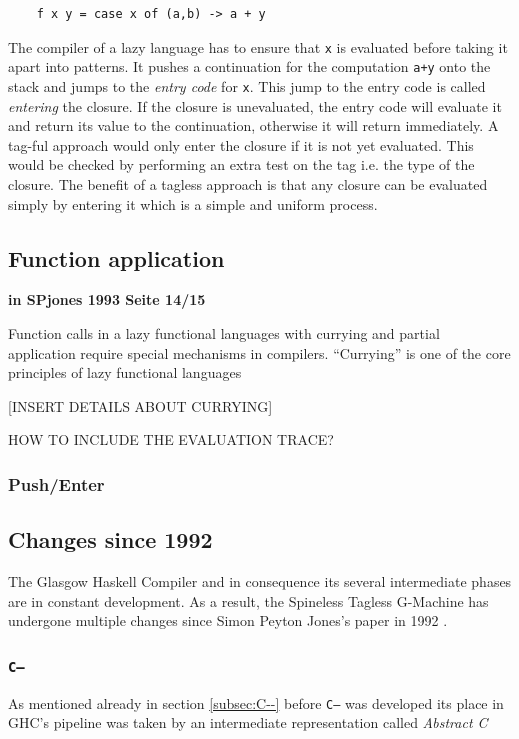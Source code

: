 \documentclass[runningheads]{llncs}
\begin{document}
\begin{center}
	\begin{BVerbatim}
	f x y = case x of (a,b) -> a + y
	\end{BVerbatim}
\end{center}

The compiler of a lazy language has to ensure that \texttt{x} is evaluated before taking it apart into patterns. It pushes a continuation for the computation \texttt{a+y} onto the stack and jumps to the \textit{entry code} for \texttt{x}. This jump to the entry code is called \textit{entering} the closure. If the closure is unevaluated, the entry code will evaluate it and return its value to the continuation, otherwise it will return immediately.
A tag-ful approach would only enter the closure if it is not yet evaluated. This would be checked by performing an extra test on the tag i.e. the type of the closure. The benefit of a tagless approach is that any closure can be evaluated simply by entering it which is a simple and uniform process. \cite{marlow2007faster}



\subsection{Function application}
\textbf{in SPjones 1993 Seite 14/15}

Function calls in a lazy functional languages with currying and partial application require special mechanisms in compilers.
\enquote{Currying} is one of the core principles of lazy functional languages 

[INSERT DETAILS ABOUT CURRYING]


HOW TO INCLUDE THE EVALUATION TRACE?


\subsubsection{Push/Enter}


\subsection{Changes since 1992}
The Glasgow Haskell Compiler and in consequence its several intermediate phases are in constant development. As a result, the Spineless Tagless G-Machine has undergone multiple changes since Simon Peyton Jones's paper in 1992 \cite{jones1992implementing}. 


\subsubsection{\texttt{C--}}
As mentioned already in section \ref{subsec:C--} before \texttt{C--} was developed its place in GHC's pipeline was taken by an intermediate representation called \textit{Abstract C}
\end{document}
